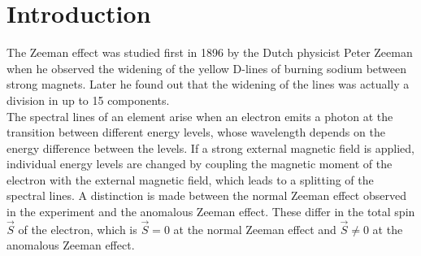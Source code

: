 \section{Introduction}
The Zeeman effect was studied first in 1896 by the Dutch physicist Peter Zeeman when he observed the widening of the yellow D-lines of burning sodium between strong magnets.
Later he found out that the widening of the lines was actually a division in up to 15 components.\\
The spectral lines of an element arise when an electron emits a photon at the transition between different energy levels, whose wavelength depends on the energy difference between the levels.
If a strong external magnetic field is applied, individual energy levels are changed by coupling the magnetic moment of the electron with the external magnetic field, which leads to a splitting of the spectral lines.
A distinction is made between the normal Zeeman effect observed in the experiment and the anomalous Zeeman effect.
These differ in the total spin $\vec{S}$ of the electron, which is $\vec{S} = 0$ at the normal Zeeman effect and $\vec{S}\neq 0$ at the anomalous Zeeman effect.